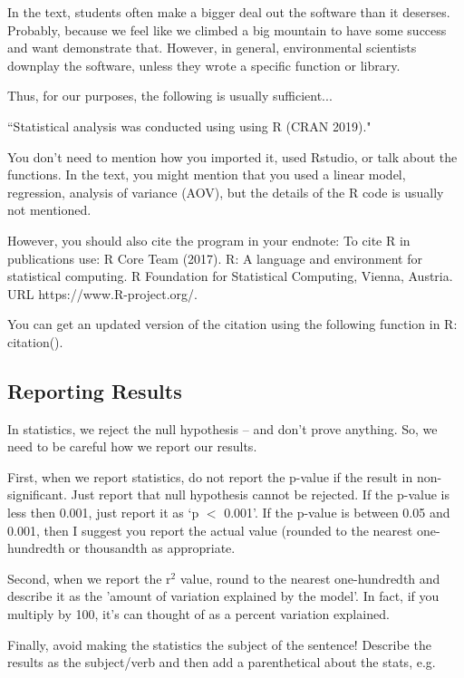 \documentclass{article}\usepackage[]{graphicx}\usepackage[]{color}
\begin{document}
In the text, students often make a bigger deal out the software than it deserses. Probably, because we feel like we climbed a big mountain to have some success and want demonstrate that. However, in general, environmental scientists downplay the software, unless they wrote a specific function or library. 

Thus, for our purposes, the following is usually sufficient...

\noindent ``Statistical analysis was conducted using using R (CRAN 2019)."

You don't need to mention how you imported it, used Rstudio, or talk about the functions. In the text, you might mention that you used a linear model, regression, analysis of variance (AOV), but the details of the R code is usually not mentioned.

However, you should also cite the program in your endnote: 
\smallskip
To cite R in publications use:
\medskip
\noindent R Core Team (2017). R: A language and environment for statistical
  computing. R Foundation for Statistical Computing, Vienna, Austria. URL
  https://www.R-project.org/.

\smallskip
\noindent You can get an updated version of the citation using the following function in R: citation(). 
  

\subsection{Reporting Results}

In statistics, we reject the null hypothesis -- and don't prove anything. So, we need to be careful how we report our results. 

First, when we report statistics, do not report the p-value if the result in non-significant. Just report that null hypothesis cannot be rejected. If the p-value is less then 0.001, just report it as `p $<$ 0.001'. If the p-value is between 0.05 and 0.001, then I suggest you report the actual value (rounded to the nearest one-hundredth or thousandth as appropriate. 

Second, when we report the r$^2$ value, round to the nearest one-hundredth and describe it as the 'amount of variation explained by the model'. In fact, if you multiply by 100, it's can thought of as a percent variation explained.

Finally, avoid making the statistics the subject of the sentence! Describe the results as the subject/verb and then add a parenthetical about the stats, e.g.
\end{document}
